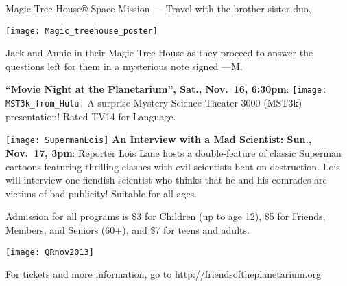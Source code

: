 \documentclass{article}
\begin{document}
\begin{multicols}{2}
{       Magic Tree House® Space Mission — Travel with the brother-sis\-ter duo, 
       \begin{floatingfigure}{0.9in}

          \texttt{[image: Magic\_treehouse\_poster]}
       
       \end{floatingfigure}      
       Jack and
       Annie in their Magic Tree House as they pro\-ceed to an\-swer the questions left
       for them in a mysterious note signed —M. 
       
       }

   \vskip 0.4cm

   \textbf{“Movie Night at the Planetarium”, Sat., Nov.~16, 6:30pm}:
   \texttt{[image: MST3k\_from\_Hulu]}
    A surprise Mystery Science Theater 3000 (MST3k) presentation! 
    Rated TV14 for Language.

   \vskip 0.4cm

   \texttt{[image: SupermanLois]}
   \textbf{An Interview with a Mad Scientist: Sun., Nov.~17, 3pm}:
   Reporter Lois Lane hosts a double-feature of classic Superman cartoons featuring thrilling clashes with evil scientists bent on destruction. Lois will interview one fiendish scientist who thinks that he and his comrades are victims of bad publicity! Suitable for all ages.

\end{multicols}

Admission for all programs is \$3 for Children (up to age 12), \$5 for Friends, Members, and Seniors (60+), and \$7 for teens and adults.

\begin{floatingfigure}{1.3in}
   \texttt{[image: QRnov2013]}
\end{floatingfigure}      

For tickets and more information, go to http://friendsoftheplanetarium.org
\end{document}
